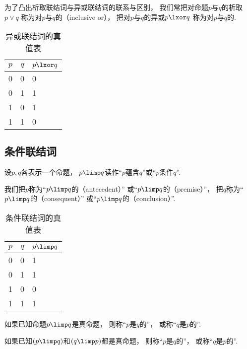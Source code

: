 为了凸出析取联结词与异或联结词的联系与区别，
我们常把对命题\(p\)与\(q\)的析取\(p \lor q\)
称为对\(p\)与\(q\)的（inclusive or），
把对\(p\)与\(q\)的异或\(p \lxor q\)
称为对\(p\)与\(q\)的.

\begin{table}[ht]
	\centering
	\begin{tabular}{|*{2}{c|}p{2cm}|}
		\hline
		\(p\) & \(q\) & \(p \lxor q\) \\
		\hline
		0 & 0 & 0 \\
		0 & 1 & 1 \\
		1 & 0 & 1 \\
		1 & 1 & 0 \\
		\hline
	\end{tabular}
	\caption{异或联结词的真值表}
\end{table}

\subsection{条件联结词}
设\(p,q\)各表示一个命题，
\(p \limp q\)读作“\(p\)蕴含\(q\)”或“\(p\)条件\(q\)”.

我们把\(p\)称为“\(p \limp q\)的（antecedent）”
或“\(p \limp q\)的（premise）”，
把\(q\)称为“\(p \limp q\)的（consequent）”
或“\(p \limp q\)的（conclusion）”.

\begin{table}[ht]
	\centering
	\begin{tabular}{|*{2}{c|}p{2cm}|}
		\hline
		\(p\) & \(q\) & \(p \limp q\) \\
		\hline
		0 & 0 & 1 \\
		0 & 1 & 1 \\
		1 & 0 & 0 \\
		1 & 1 & 1 \\
		\hline
	\end{tabular}
	\caption{条件联结词的真值表}
\end{table}

如果已知命题\(p \limp q\)是真命题，
则称“\(p\)是\(q\)的”，
或称“\(q\)是\(p\)的”.

如果已知\((p \limp q)\)和\((q \limp p)\)都是真命题，
则称“\(p\)是\(q\)的”，
或称“\(q\)是\(p\)的”.

